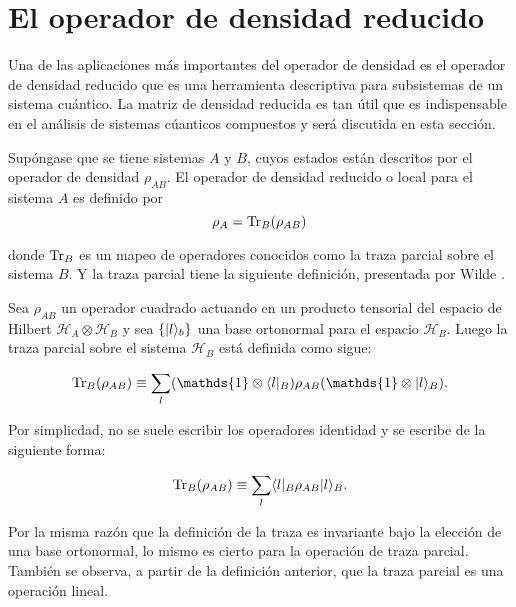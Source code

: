 \section{El operador de densidad reducido}

Una de las aplicaciones más importantes del operador de densidad es el operador de densidad reducido que es una herramienta descriptiva para subsistemas de un sistema cuántico. La matriz de densidad reducida es tan útil que es indispensable en el análisis de sistemas cúanticos compuestos y será discutida en esta sección.


Supóngase que se tiene sistemas $A$ y $B$, cuyos estados están descritos por el operador de densidad $\rho_{AB}$. El operador de densidad reducido o local para el sistema $A$ es definido por 
\begin{equation}
	\rho_A={\rm Tr}_B(\rho_{AB})
\end{equation}

donde ${\rm Tr}_B$ es un mapeo de operadores conocidos como la traza parcial sobre el sistema $B$. Y la traza parcial tiene la siguiente definición, presentada por Wilde {\cite{wilde2011classical}}.





\begin{definition}
	
	Sea  $ \rho_{AB}$ un operador cuadrado actuando en un producto tensorial del espacio de Hilbert $\mathcal{H}_A \otimes \mathcal{ H}_B$ y sea $\{|l\rangle_b\}$ una base ortonormal para el espacio $\mathcal{H}_B$. Luego la traza parcial sobre el sistema $\mathcal{H}_B$ está definida como sigue:
	
	\begin{equation}
		\tr_B(\rho_{AB})\equiv\sum_{l} (\mathds{1}\otimes\la l|_B)\rho_{AB}(\mathds{1}\otimes|l\ra_B).	
	\end{equation}

Por simplicdad, no se suele escribir los operadores identidad y se escribe de la siguiente forma:

\begin{equation}
	{\rm Tr}_B(\rho_{AB})\equiv\sum_{l} \langle l|_B\rho_{AB}|l\rangle_B.
\end{equation}

	\end{definition}


Por la misma razón que la definición de la traza es invariante bajo la elección de una base ortonormal, lo mismo es cierto para la operación de traza parcial. También se observa, a partir de la definición anterior, que la traza parcial es una operación lineal.


